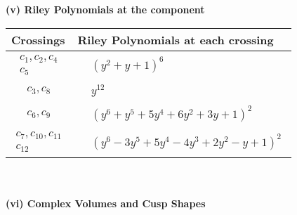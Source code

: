 \documentclass[1p]{elsarticle_modified}
\theoremstyle{definition}
\begin{document}
\newpage\renewcommand{\arraystretch}{1}
\flushleft \textbf{(v) Riley Polynomials at the component}\newline \\
\begin{tabular}{m{50pt}|m{274pt}}
Crossings & \hspace{64pt}Riley Polynomials at each crossing \\
\hline $$\begin{aligned}c_{1},c_{2},c_{4}\\c_{5}\end{aligned}$$&$\begin{aligned}
&(y^2+y+1)^6
\end{aligned}$\\
\hline $$\begin{aligned}c_{3},c_{8}\end{aligned}$$&$\begin{aligned}
&y^{12}
\end{aligned}$\\
\hline $$\begin{aligned}c_{6},c_{9}\end{aligned}$$&$\begin{aligned}
&(y^6+y^5+5 y^4+6 y^2+3 y+1)^2
\end{aligned}$\\
\hline $$\begin{aligned}c_{7},c_{10},c_{11}\\c_{12}\end{aligned}$$&$\begin{aligned}
&(y^6-3 y^5+5 y^4-4 y^3+2 y^2- y+1)^2
\end{aligned}$\\
\hline
\end{tabular}\\~\\
\newpage\flushleft \textbf{(vi) Complex Volumes and Cusp Shapes}
\end{document}
